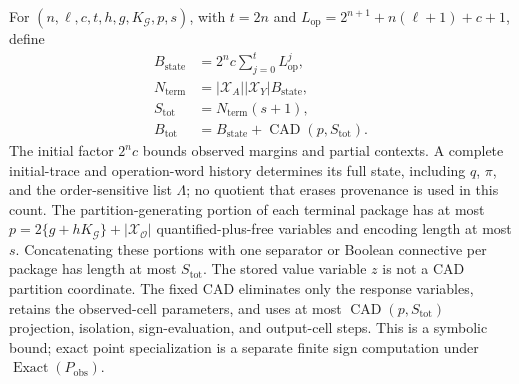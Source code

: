 For \((n,\ell,c,t,h,g,K_{\mathcal G},p,s)\), with \(t=2n\) and \(L_{\mathrm{op}}=2^{n+1}+n(\ell+1)+c+1\), define
\[
\begin{aligned}
B_{\mathrm{state}}&=2^n c\sum_{j=0}^{t}L_{\mathrm{op}}^j,\\
N_{\mathrm{term}}&=|\mathcal X_A||\mathcal X_Y|B_{\mathrm{state}},\\
S_{\mathrm{tot}}&=N_{\mathrm{term}}(s+1),\\
B_{\mathrm{tot}}&=B_{\mathrm{state}}+\operatorname{CAD}(p,S_{\mathrm{tot}}).
\end{aligned}
\]
The initial factor \(2^n c\) bounds observed margins and partial contexts. A complete initial-trace and operation-word history determines its full state, including \(q\), \(\pi\), and the order-sensitive list \(\Lambda\); no quotient that erases provenance is used in this count. The partition-generating portion of each terminal package has at most \(p=2\{g+hK_{\mathcal G}\}+|\mathcal X_{\mathcal O}|\) quantified-plus-free variables and encoding length at most \(s\). Concatenating these portions with one separator or Boolean connective per package has length at most \(S_{\mathrm{tot}}\). The stored value variable \(z\) is not a CAD partition coordinate. The fixed CAD eliminates only the response variables, retains the observed-cell parameters, and uses at most \(\operatorname{CAD}(p,S_{\mathrm{tot}})\) projection, isolation, sign-evaluation, and output-cell steps. This is a symbolic bound; exact point specialization is a separate finite sign computation under \(\operatorname{Exact}(P_{\mathrm{obs}})\).